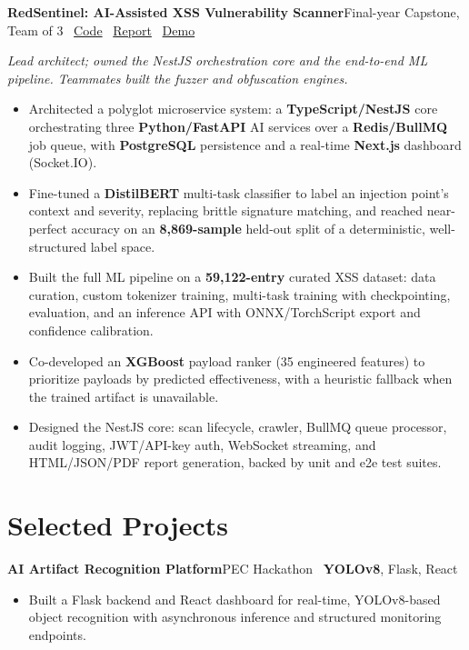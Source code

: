 \documentclass[a4paper,10pt]{article}
\newcommand{\project}[2]{\textbf{#1}\hfill{\color{rulegray}\small #2}\par\vspace{1pt}}
\begin{document}
\project{RedSentinel: AI-Assisted XSS Vulnerability Scanner}{Final-year Capstone, Team of 3 \textbar\ \href{https://github.com/seamoonpandey/Xbow}{Code} \textbar\ \href{https://github.com/seamoonpandey/Xbow-report}{Report} \textbar\ \href{https://drive.google.com/file/d/1HZmdURP3l8JNoTyL40me_O1-8kat4Q9d/view?usp=sharing}{Demo}}
\textit{Lead architect; owned the NestJS orchestration core and the end-to-end ML pipeline. Teammates built the fuzzer and obfuscation engines.}
\begin{itemize}
\item Architected a polyglot microservice system: a \textbf{TypeScript/NestJS} core orchestrating three \textbf{Python/FastAPI} AI services over a \textbf{Redis/BullMQ} job queue, with \textbf{PostgreSQL} persistence and a real-time \textbf{Next.js} dashboard (Socket.IO).
\item Fine-tuned a \textbf{DistilBERT} multi-task classifier to label an injection point's context and severity, replacing brittle signature matching, and reached near-perfect accuracy on an \textbf{8,869-sample} held-out split of a deterministic, well-structured label space.
\item Built the full ML pipeline on a \textbf{59,122-entry} curated XSS dataset: data curation, custom tokenizer training, multi-task training with checkpointing, evaluation, and an inference API with ONNX/TorchScript export and confidence calibration.
\item Co-developed an \textbf{XGBoost} payload ranker (35 engineered features) to prioritize payloads by predicted effectiveness, with a heuristic fallback when the trained artifact is unavailable.
\item Designed the NestJS core: scan lifecycle, crawler, BullMQ queue processor, audit logging, JWT/API-key auth, WebSocket streaming, and HTML/JSON/PDF report generation, backed by unit and e2e test suites.
\end{itemize}

\section*{Selected Projects}

\project{AI Artifact Recognition Platform}{PEC Hackathon \textbar\ \textbf{YOLOv8}, Flask, React}
\begin{itemize}
\item Built a Flask backend and React dashboard for real-time, YOLOv8-based object recognition with asynchronous inference and structured monitoring endpoints.
\end{itemize}
\end{document}
